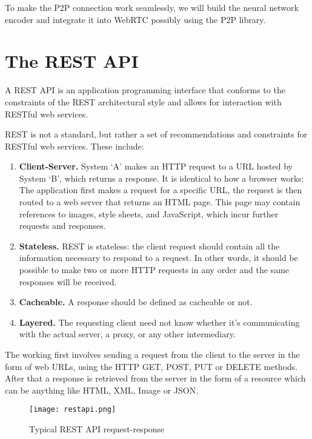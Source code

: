 To make the P2P connection work seamlessly, we will build the neural network encoder and 
integrate it into WebRTC possibly using the P2P library.

\section{The REST API}

A REST API is an application programming interface that conforms to the constraints of the REST 
architectural style and allows for interaction with RESTful web services.

REST is not a standard, but rather a set of recommendations and constraints for 
RESTful web services. These include:

\begin{enumerate}
    \item \textbf{Client-Server.} System ‘A’ makes an HTTP request to a URL hosted by 
    System ‘B’, which returns a response.
    It is identical to how a browser works: The application first makes a request 
    for a specific URL, the request is then routed to a web server that returns an HTML page. 
    This page may contain references to images, style sheets, and JavaScript, 
    which incur further requests and responses.

    \item \textbf{Stateless.} REST is stateless: the client request should contain all the 
    information necessary to respond to a request. In other words, it should be possible to
    make two or more HTTP requests in any order and the same responses will be received.

    \item \textbf{Cacheable.} A response should be defined as cacheable or not.
    
    \item \textbf{Layered.} The requesting client need not know whether it’s communicating 
    with the actual server, a proxy, or any other intermediary.~\cite{DevelopersRestAPI}
    
\end{enumerate}

The working first involves sending a request from the client to the server in the form of web URLs, 
using the HTTP GET, POST, PUT or DELETE methods. After that a response is retrieved from the server 
in the form of a resource which can be anything like HTML, XML, Image or JSON.~\cite{WhatisRESTAPI}

\begin{figure}
    \begin{center}
        \texttt{[image: restapi.png]}
    \end{center}
    \caption{Typical REST API request-response}
    \label{fig:restapi}
\end{figure}

